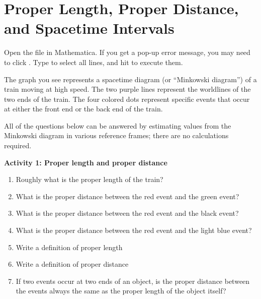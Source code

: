 \section{Proper Length, Proper Distance, and Spacetime Intervals}

\makelabheader %

\bigskip

Open the file  in Mathematica. If you get a pop-up error message, you may need to click . Type  to select all lines, and hit  to execute them.

The graph you see represents a spacetime diagram (or ``Minkowski diagram'') of a train moving at high speed. The two purple lines represent the worldlines of the two ends of the train. The four colored dots represent specific events that occur at either the front end or the back end of the train.

All of the questions below can be answered by estimating values from the Minkowski diagram in various reference frames; there are no calculations required.

\textbf{Activity 1: Proper length and proper distance}

\begin{enumerate}[labparts]
\item Roughly what is the proper length of the train?
\answerspace{0.6in}

\item What is the proper distance between the red event and the green event?
\answerspace{0.6in}

\item What is the proper distance between the red event and the black event?
\answerspace{0.6in}

\item What is the proper distance between the red event and the light blue event?
\answerspace{0.6in}

\item Write a definition of proper length
\answerspace{0.7in}

\item Write a definition of proper distance
\answerspace{0.7in}

\item If two events occur at two ends of an object, is the proper distance between the events always the same as the proper length of the object itself?
\answerspace{0.7in}
\end{enumerate}

